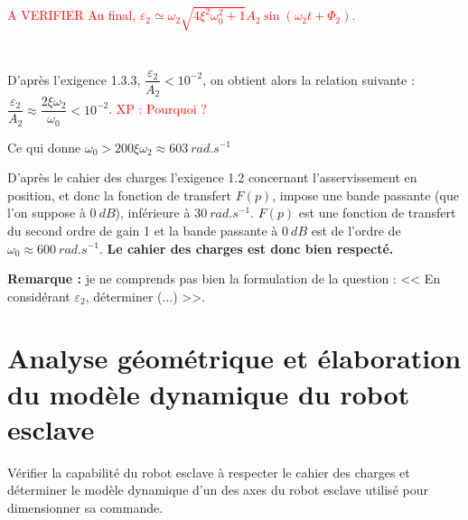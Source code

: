 \documentclass[10pt,fleqn]{article} %
\begin{document}
\textcolor{red}{A VERIFIER Au final, $\varepsilon_2 \simeq \omega_2 \sqrt{4\xi^2\omega_0^2  + 1} A_2\sin \left(\omega_2 t + \Phi_2 \right) $.}

\subparagraph{}	~\\
D'après l'exigence 1.3.3, $\dfrac{\varepsilon_2}{A_2}<10^{-2}$, on obtient alors la relation suivante : $
\dfrac{\varepsilon_2}{A_2}\approx \dfrac{2\xi\omega_2}{\omega_0}<10^{-2}$.  \textcolor{red}{XP : Pourquoi ?}

Ce qui donne $\omega_0>200\xi\omega_2\approx \SI{603}{rad.s^{-1}}$

D'après le cahier des charges l'exigence 1.2 concernant l'asservissement en position, et donc la fonction de transfert $F(p)$, impose une bande passante (que l'on suppose à $\SI{0}{dB}$), inférieure à $\SI{30}{rad.s^{-1}}$. $F(p)$ est une fonction de transfert du second ordre de gain 1 et la bande passante à $\SI{0}{dB}$ est de l'ordre de $\omega_0\approx \SI{600}{rad.s^{-1}}$. \textbf{Le cahier des charges est donc bien respecté.}





\textbf{Remarque :} je ne comprends pas bien la formulation de la question : << En considérant $\varepsilon_2$, déterminer (...) >>.


\section{Analyse géométrique et élaboration du modèle dynamique du robot esclave}

\begin{obj}
Vérifier la capabilité du robot esclave à respecter le cahier des charges et déterminer le modèle dynamique
d’un des axes du robot esclave utilisé pour dimensionner sa commande.
\end{obj}
\end{document}
